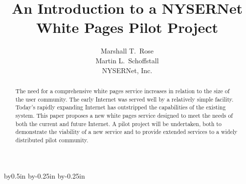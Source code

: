 



\makeatletter
\let\titlep@ge=\titlepage
\def\titlepage{\titlep@ge \def\thefootnote{\fnsymbol{footnote}}}

\let\endtitlep@ge=\endtitlepage
\let\endtitlepage=\relax

\let\m@ketitle=\maketitle
\def\maketitle{\m@ketitle\let\titlepage=\relax\let\endtitlepage=\endtitlep@ge}
\makeatother

\advance\textwidth by0.5in
\advance\oddsidemargin by-0.25in
\advance\evensidemargin by-0.25in



\title{An Introduction to a NYSERNet\\ White Pages Pilot Project}
\author{Marshall T.~Rose\\ Martin L.~Schoffstall\\ NYSERNet, Inc.}
\maketitle

\begin{abstract}
The need for a comprehensive white pages service increases in relation to the
size of the user community.
The early Internet was served well by a relatively simple facility.
Today's rapidly expanding Internet has outstripped the capabilities of the
existing system.
This paper proposes a new white pages service designed to meet the needs
of both the current and future Internet.
A pilot project will be undertaken,
both to demonstrate the viability of a new service and to provide extended services
to a widely distributed pilot community.

\end{abstract}

